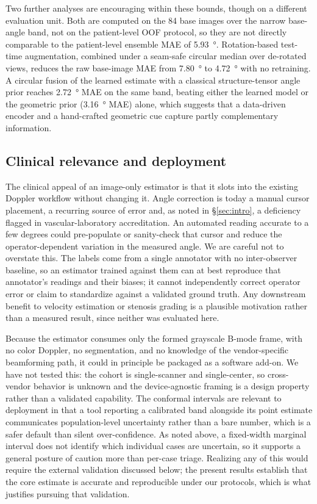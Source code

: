 Two further analyses are encouraging within these bounds, though on a different
evaluation unit. Both are computed on the \num{84} base images over the narrow
base-angle band, not on the patient-level OOF protocol, so they are not directly
comparable to the patient-level ensemble MAE of \SI{5.93}{\degree}. Rotation-based
test-time augmentation, combined under a seam-safe circular median over de-rotated
views, reduces the raw base-image MAE from \SI{7.80}{\degree} to \SI{4.72}{\degree}
with no retraining. A circular fusion of the learned estimate with a classical
structure-tensor angle prior reaches \SI{2.72}{\degree} MAE on the same band,
beating either the learned model or the geometric prior (\SI{3.16}{\degree} MAE)
alone, which suggests that a data-driven encoder and a hand-crafted geometric cue
capture partly complementary information.

\subsection{Clinical relevance and deployment}

The clinical appeal of an image-only estimator is that it slots into the existing
Doppler workflow without changing it. Angle correction is today a manual cursor
placement, a recurring source of error and, as noted in \S\ref{sec:intro}, a
deficiency flagged in vascular-laboratory accreditation. An automated reading
accurate to a few degrees could pre-populate or sanity-check that cursor and reduce
the operator-dependent variation in the measured angle. We are careful not to
overstate this. The labels come from a single annotator with no inter-observer
baseline, so an estimator trained against them can at best reproduce that
annotator's readings and their biases; it cannot independently correct operator
error or claim to standardize against a validated ground truth. Any downstream
benefit to velocity estimation or stenosis grading is a plausible motivation rather
than a measured result, since neither was evaluated here.

Because the estimator consumes only the formed grayscale B-mode frame, with no
color Doppler, no segmentation, and no knowledge of the vendor-specific beamforming
path, it could in principle be packaged as a software add-on. We have not tested
this: the cohort is single-scanner and single-center, so cross-vendor behavior is
unknown and the device-agnostic framing is a design property rather than a validated
capability. The conformal intervals are relevant to deployment in that a tool
reporting a calibrated band alongside its point estimate communicates population-level
uncertainty rather than a bare number, which is a safer default than silent
over-confidence. As noted above, a fixed-width marginal interval does not identify
which individual cases are uncertain, so it supports a general posture of caution
more than per-case triage. Realizing any of this would require the external
validation discussed below; the present results establish that the core estimate is
accurate and reproducible under our protocols, which is what justifies pursuing that
validation.

